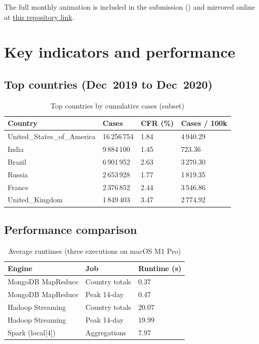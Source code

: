 \documentclass[12pt,a4paper]{article}
\begin{document}
\noindent The full monthly animation is included in the submission () and mirrored online at \href{https://github.com/rauldd-sys/Project3-BigData-Course/blob/bf0ccccac5b6f8c0a8112404d1aa68418e771dfa/visualizations/covid_cases.mp4}{this repository link}.

\section{Key indicators and performance}
\subsection{Top countries (Dec~2019 to Dec~2020)}
\begin{table}[H]
    \centering
    \caption{Top countries by cumulative cases (subset)}
    \begin{tabular}{@{}p{5.2cm}p{1.8cm}p{1.8cm}p{1.8cm}@{}}
        \toprule
        Country & Cases & CFR (\%) & Cases / 100k \\
        \midrule
        United\_States\_of\_America & 16\,256\,754 & 1.84 & 4\,940.29 \\
        India & 9\,884\,100 & 1.45 & 723.36 \\
        Brazil & 6\,901\,952 & 2.63 & 3\,270.30 \\
        Russia & 2\,653\,928 & 1.77 & 1\,819.35 \\
        France & 2\,376\,852 & 2.44 & 3\,546.86 \\
        United\_Kingdom & 1\,849\,403 & 3.47 & 2\,774.92 \\
        \bottomrule
    \end{tabular}
\end{table}
\FloatBarrier

\subsection{Performance comparison}
\begin{table}[H]
    \centering
    \caption{Average runtimes (three executions on macOS M1 Pro)}
    \begin{tabular}{@{}p{3.5cm}p{4cm}p{4cm}@{}}
        \toprule
        Engine & Job & Runtime (s) \\
        \midrule
        MongoDB MapReduce & Country totals & 0.37 \\
        MongoDB MapReduce & Peak 14-day & 0.47 \\
        Hadoop Streaming & Country totals & 20.07 \\
        Hadoop Streaming & Peak 14-day & 19.99 \\
        Spark (local[4]) & Aggregations & 7.97 \\
        \bottomrule
    \end{tabular}
\end{table}
\FloatBarrier
\end{document}
